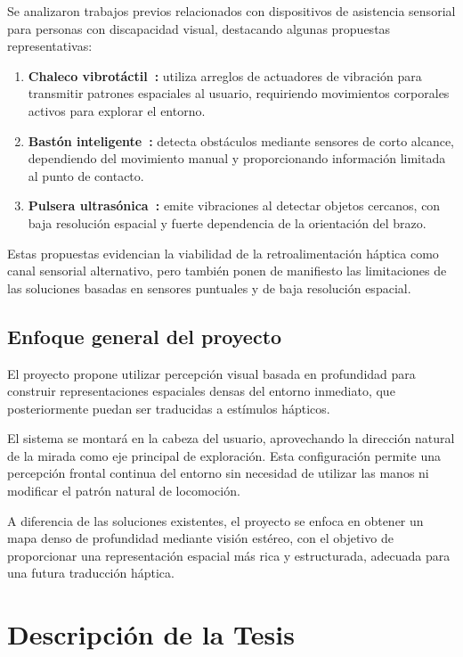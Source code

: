 Se analizaron trabajos previos relacionados con dispositivos de asistencia sensorial para personas con discapacidad visual,
destacando algunas propuestas representativas:

\begin{enumerate}
    \item \textbf{Chaleco vibrotáctil~\cite{Novich2015}:} utiliza arreglos de actuadores de vibración para transmitir patrones espaciales al usuario,
    requiriendo movimientos corporales activos para explorar el entorno.
    \item \textbf{Bastón inteligente~\cite{Santos2023}:} detecta obstáculos mediante sensores de corto alcance, dependiendo del movimiento manual y
    proporcionando información limitada al punto de contacto.
    \item \textbf{Pulsera ultrasónica~\cite{Petsiuk2019UltrasoundNavigation}:} emite vibraciones al detectar objetos cercanos, con baja resolución
    espacial y fuerte
    dependencia de la orientación del brazo.
\end{enumerate}

Estas propuestas evidencian la viabilidad de la retroalimentación háptica como canal sensorial alternativo,
pero también ponen de manifiesto las limitaciones de las soluciones basadas en sensores puntuales y de baja resolución espacial.

\subsection{Enfoque general del proyecto}

El proyecto propone utilizar percepción visual basada en profundidad para construir representaciones espaciales densas del entorno inmediato,
que posteriormente puedan ser traducidas a estímulos hápticos.

El sistema se montará en la cabeza del usuario, aprovechando la dirección natural de la mirada como eje principal de exploración. Esta configuración
permite una percepción frontal continua del entorno sin necesidad de utilizar las manos ni modificar el patrón natural de locomoción.

A diferencia de las soluciones existentes, el proyecto se enfoca en obtener un mapa denso de profundidad mediante visión estéreo, con
el objetivo de proporcionar una representación espacial más rica y estructurada, adecuada para una futura traducción háptica.

\section{Descripción de la Tesis}

